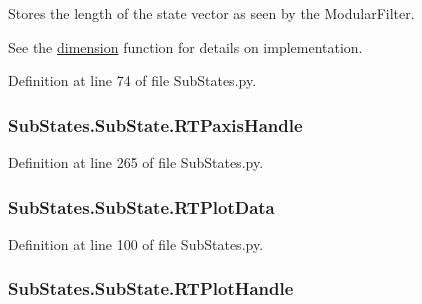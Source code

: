 Stores the length of the state vector as seen by the Modular\+Filter. 

See the \hyperlink{classSubStates_1_1SubState_a4aebea19a134cb871a7c0b6c2709546a}{dimension} function for details on implementation. 

Definition at line 74 of file Sub\+States.\+py.

\subsubsection[{\texorpdfstring{R\+T\+Paxis\+Handle}{RTPaxisHandle}}]{\setlength{\rightskip}{0pt plus 5cm}Sub\+States.\+Sub\+State.\+R\+T\+Paxis\+Handle}\hypertarget{classSubStates_1_1SubState_a41c912457be8682326d60f82cc651207}{}\label{classSubStates_1_1SubState_a41c912457be8682326d60f82cc651207}


Definition at line 265 of file Sub\+States.\+py.

\subsubsection[{\texorpdfstring{R\+T\+Plot\+Data}{RTPlotData}}]{\setlength{\rightskip}{0pt plus 5cm}Sub\+States.\+Sub\+State.\+R\+T\+Plot\+Data}\hypertarget{classSubStates_1_1SubState_aae3aa07f0d6f54a510db66e0644c958e}{}\label{classSubStates_1_1SubState_aae3aa07f0d6f54a510db66e0644c958e}


Definition at line 100 of file Sub\+States.\+py.

\subsubsection[{\texorpdfstring{R\+T\+Plot\+Handle}{RTPlotHandle}}]{\setlength{\rightskip}{0pt plus 5cm}Sub\+States.\+Sub\+State.\+R\+T\+Plot\+Handle}\hypertarget{classSubStates_1_1SubState_ab92a0fafcfd778b8965e3f649ff94fc7}{}\label{classSubStates_1_1SubState_ab92a0fafcfd778b8965e3f649ff94fc7}


